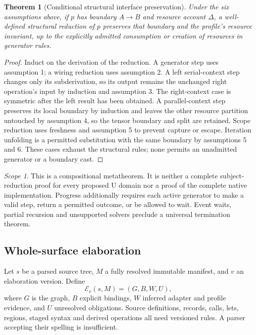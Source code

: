\documentclass[11pt]{article}
\newtheorem{theorem}[definition]{Theorem}
\theoremstyle{remark}
\newtheorem{remark}[definition]{Scope}
\begin{document}
\begin{theorem}[Conditional structural interface preservation]
Under the six assumptions above, if $p$ has boundary $A\to B$ and
resource account $\Delta$, a well-defined structural reduction of $p$
preserves that boundary and the profile's resource invariant, up to the
explicitly admitted consumption or creation of resources in generator rules.
\end{theorem}
\begin{proof}
Induct on the derivation of the reduction. A generator step uses assumption
1; a wiring reduction uses assumption 2. A left serial-context step changes
only its subderivation, so its output remains the unchanged right operation's
input by induction and assumption 3. The right-context case is symmetric
after the left result has been obtained. A parallel-context step preserves
its local boundary by induction and leaves the other resource partition
untouched by assumption 4, so the tensor boundary and split are retained.
Scope reduction uses freshness and assumption 5 to prevent capture or
escape. Iteration unfolding is a permitted substitution with the same
boundary by assumptions 5 and 6. These cases exhaust the structural rules;
none permits an unadmitted generator or a boundary cast.
\end{proof}

\begin{remark}
This is a compositional metatheorem. It is neither a complete subject-reduction
proof for every proposed U domain nor a proof of the complete native implementation.
Progress additionally requires each active generator to make a valid step,
return a permitted outcome, or be allowed to wait. Event waits, partial
recursion and unsupported solvers preclude a universal termination theorem.
\end{remark}

\subsection{Whole-surface elaboration}

Let $s$ be a parsed source tree, $M$ a fully resolved immutable manifest,
and $v$ an elaboration version. Define
\[
 \mathcal E_v(s,M)=(G,B,W,U),
\]
where $G$ is the graph, $B$ explicit bindings, $W$ inferred adapter and
profile evidence, and $U$ unresolved obligations. Source definitions,
records, calls, lets, regions, staged syntax and derived operations all need
versioned rules. A parser accepting their spelling is insufficient.
\end{document}
